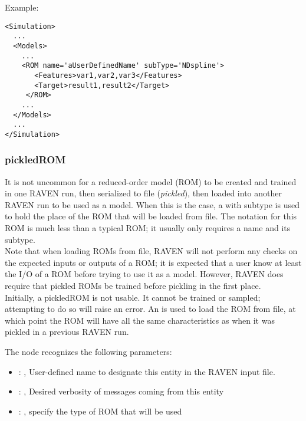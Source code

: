 \hspace{24pt}
Example:
\begin{lstlisting}[style=XML]
<Simulation>
  ...
  <Models>
    ...
    <ROM name='aUserDefinedName' subType='NDspline'>
       <Features>var1,var2,var3</Features>
       <Target>result1,result2</Target>
     </ROM>
    ...
  </Models>
  ...
</Simulation>
\end{lstlisting}


\subsubsection{pickledROM}
  It is not uncommon for a reduced-order model (ROM) to be created and trained in one RAVEN run,
  then     serialized to file (\emph{pickled}), then loaded into another RAVEN run to be used as a
  model.  When this is     the case, a  with subtype  is used to
  hold the place of the ROM that will     be loaded from file.  The notation for this ROM is much
  less than a typical ROM; it usually only requires a name and     its subtype.     \\     Note that
  when loading ROMs from file, RAVEN will not perform any checks on the expected inputs or outputs
  of     a ROM; it is expected that a user know at least the I/O of a ROM before trying to use it as
  a model.     However, RAVEN does require that pickled ROMs be trained before pickling in the first
  place.     \\     Initially, a pickledROM is not usable.  It cannot be trained or sampled;
  attempting to do so will raise an     error.  An  is used to load the ROM from
  file, at which point the ROM will have all the same     characteristics as when it was pickled in
  a previous RAVEN run.

  The  node recognizes the following parameters:
    \begin{itemize}
      \item {}: , 
        User-defined name to designate this entity in the RAVEN input file.
      \item {}: , 
        Desired verbosity of messages coming from this entity
      \item {}: , 
        specify the type of ROM that will be used
  \end{itemize}

